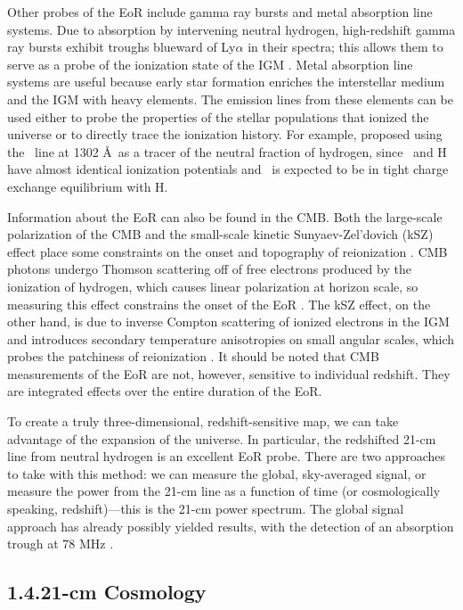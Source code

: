 \documentclass[12pt]{article}
\begin{document}
Other probes of the EoR include gamma ray bursts and metal absorption line systems. Due to absorption by intervening neutral hydrogen, high-redshift gamma ray bursts exhibit troughs blueward of Ly$\alpha$ in their spectra; this allows them to serve as a probe of the ionization state of the IGM \citep[e.g.,][]{gallerani2008}. Metal absorption line systems are useful because early star formation enriches the interstellar medium and the IGM with heavy elements. The emission lines from these elements can be used either to probe the properties of the stellar populations that ionized the universe or to directly trace the ionization history. For example, \cite{oh2002} proposed using the \OI~line at 1302 \AA~as a tracer of the neutral fraction of hydrogen, since \OI~and H have almost identical ionization potentials and \OI~is expected to be in tight charge exchange equilibrium with H.

Information about the EoR can also be found in the CMB. Both the large-scale polarization of the CMB and the small-scale kinetic Sunyaev-Zel'dovich (kSZ) effect place some constraints on the onset and topography of reionization \citep{fan2006}. CMB photons undergo Thomson scattering off of free electrons produced by the ionization of hydrogen, which causes linear polarization at horizon scale, so measuring this effect constrains the onset of the EoR \citep[e.g.,][]{zaldarriaga1997, roy2018}. The kSZ effect, on the other hand, is due to inverse Compton scattering of ionized electrons in the IGM and introduces secondary temperature anisotropies on small angular scales, which probes the patchiness of reionization \citep{fan2006, park2013, roy2018}. It should be noted that CMB measurements of the EoR are not, however, sensitive to individual redshift. They are integrated effects over the entire duration of the EoR.

To create a truly three-dimensional, redshift-sensitive map, we can take advantage of the expansion of the universe. In particular, the redshifted 21-cm line from neutral hydrogen is an excellent EoR probe. There are two approaches to take with this method: we can measure the global, sky-averaged signal, or measure the power from the 21-cm line as a function of time (or cosmologically speaking, redshift)---this is the 21-cm power spectrum. The global signal approach has already possibly yielded results, with the detection of an absorption trough at 78 MHz \citep{bowman2018}. \vspace{3mm}

\tocless\subsection{\hypertarget{subsec:21cm}{1.4.\hspace{0.75em}21-cm Cosmology}}
\end{document}
